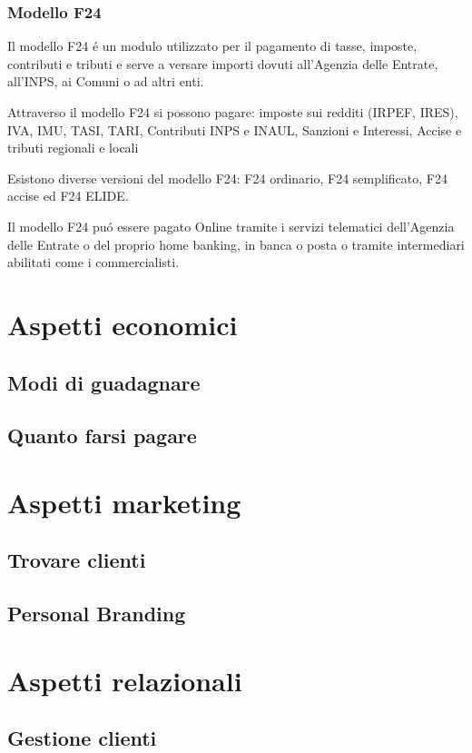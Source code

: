 \documentclass{article}
\begin{document}
\subsubsection{Modello F24}
Il modello F24 \'e un modulo utilizzato per il pagamento di tasse, imposte, contributi e tributi e serve a versare importi dovuti all'Agenzia delle Entrate, all'INPS, ai Comuni o ad altri enti. 

Attraverso il modello F24 si possono pagare: imposte sui redditi (IRPEF, IRES), IVA, IMU, TASI, TARI, Contributi INPS e INAUL, Sanzioni e Interessi, Accise e tributi regionali e locali

Esistono diverse versioni del modello F24: F24 ordinario, F24 semplificato, F24 accise ed F24 ELIDE.

Il modello F24 pu\'o essere pagato Online tramite i servizi telematici dell'Agenzia delle Entrate o del proprio home banking, in banca o posta o tramite intermediari abilitati come i commercialisti.

\section{Aspetti economici}
\subsection{Modi di guadagnare}
\subsection{Quanto farsi pagare}

\section{Aspetti marketing}
\subsection{Trovare clienti}
\subsection{Personal Branding}

\section{Aspetti relazionali}
\subsection{Gestione clienti}
\end{document}

